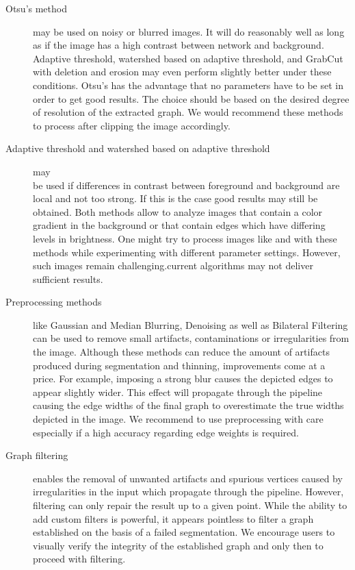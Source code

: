 	\begin{description}
	\item [Otsu's method] may be used on noisy or blurred images. It will do reasonably well as long as if the image has a high contrast between network and background. Adaptive threshold, watershed based on adaptive threshold, and GrabCut with deletion and erosion may even perform slightly better under these conditions. Otsu's has the advantage that no parameters have to be set in order to get good results. The choice should be based on the desired degree of resolution of the extracted graph. We would recommend these methods to process  after clipping the image accordingly.

	\item [Adaptive threshold and watershed based on adaptive threshold] may\\be used if differences in contrast between foreground and background are local and not too strong. If this is the case good results may still be obtained. Both methods allow to analyze images that contain a color gradient in the background or that contain edges which have differing levels in brightness. One might try to process images like  and  with these methods while experimenting with different parameter settings. However, such images remain challenging.\NEFIs current algorithms may not deliver sufficient results.

	\item [Preprocessing methods] like Gaussian and Median Blurring, Denoising as well as Bilateral Filtering can be used to remove small artifacts, contaminations or irregularities from the image. Although these methods can reduce the amount of artifacts produced during segmentation and thinning, improvements come at a price. For example, imposing a strong blur causes the depicted edges to appear slightly wider. This effect will propagate through the pipeline causing the edge widths of the final graph to overestimate the true widths depicted in the image. We recommend to use preprocessing with care especially if a high accuracy regarding edge weights is required.

	\item[Graph filtering] enables the removal of unwanted artifacts and spurious vertices caused by irregularities in the input which propagate through the pipeline. However, filtering can only repair the result up to a given point. While the ability to add custom filters is powerful, it appears pointless to filter a graph established on the basis of a failed segmentation. We encourage users to visually verify the integrity of the established graph and only then to proceed with filtering.
	\end{description}

